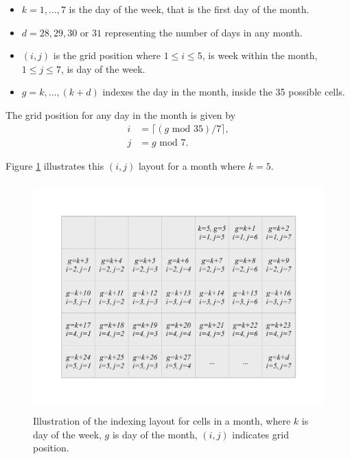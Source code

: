 \documentclass[12pt]{article}
\providecommand{\tightlist}{%
  \setlength{\itemsep}{0pt}\setlength{\parskip}{0pt}}
\begin{document}
\begin{itemize}
\tightlist
\item
  \(k = 1, \dots , 7\) is the day of the week, that is the first day of the month.
\item
  \(d = 28, 29, 30\) or \(31\) representing the number of days in any month.
\item
  \((i, j)\) is the grid position where \(1 \le i \le 5\), is week within the month, \(1 \le j \le 7\), is day of the week.
\item
  \(g = k, \dots,(k+d)\) indexes the day in the month, inside the 35 possible cells.
\end{itemize}

The grid position for any day in the month is given by
\begin{equation}
  \begin{aligned}
  i &= \lceil (g \text{ mod } 35) / 7\rceil, \\
  j &= g \text{ mod } 7.
  \end{aligned}
  \label{eq:grid}
\end{equation}

\noindent Figure \ref{fig:month-diagram} illustrates this \((i, j)\) layout for a month where \(k=5\).

\begin{figure}

{\centering \includegraphics[width=360pt,height=250pt]{img/month} 

}

\caption{Illustration of the indexing layout for cells in a month, where \(k\) is day of the week, \(g\) is day of the month, \((i, j)\) indicates grid position.}\label{fig:month-diagram}
\end{figure}
\end{document}
